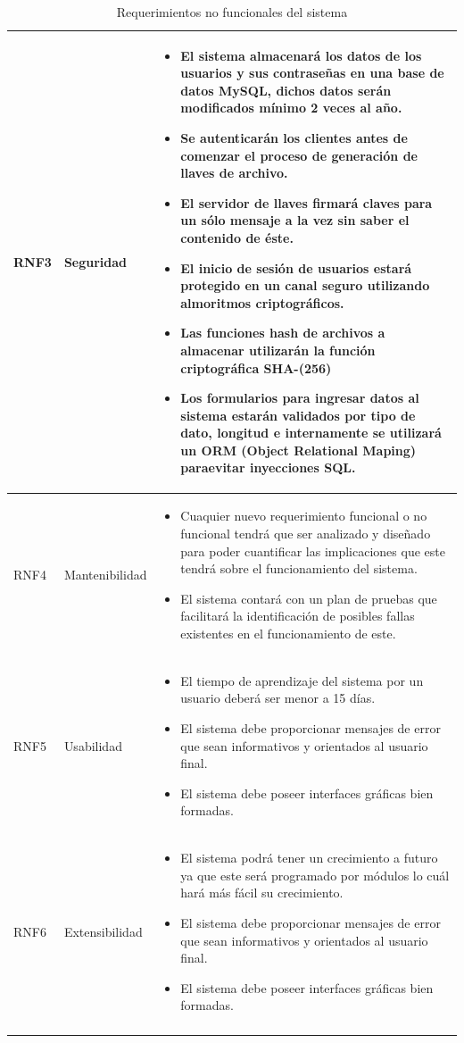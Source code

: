 \begin{longtable}{| p{1.5cm} | p{3cm} | p{11cm} |}
RNF3 & Seguridad & \begin{itemize} 
    \item El sistema almacenará los datos de los usuarios y sus contraseñas en una base de datos MySQL, dichos datos serán modificados mínimo 2  veces al año.  
   \item Se autenticarán los clientes antes de comenzar el proceso de generación de llaves de archivo. 
   \item El servidor de llaves firmará claves para un sólo mensaje a la vez sin saber el contenido de éste. 
   \item El inicio de sesión de usuarios estará protegido en un canal seguro utilizando almoritmos criptográficos. 
   \item Las funciones hash de archivos a almacenar utilizarán la función criptográfica SHA-(256)
   \item Los formularios para ingresar datos al sistema estarán validados por tipo de dato, longitud e internamente se utilizará un ORM (Object Relational Maping) paraevitar inyecciones SQL. 
 \end{itemize}

\\ \hline 
RNF4 & Mantenibilidad & \begin{itemize}
   \item Cuaquier nuevo requerimiento funcional o no funcional tendrá que ser analizado y diseñado para poder cuantificar las implicaciones que este tendrá sobre el funcionamiento del sistema. 
   \item El sistema contará con un plan de pruebas que facilitará la identificación de posibles fallas existentes en el funcionamiento de este. 
 \end{itemize}

\\ \hline
RNF5 & Usabilidad & \begin{itemize}
   \item El tiempo de aprendizaje del sistema por un usuario deberá ser menor a 15 días. 
   \item El sistema debe proporcionar mensajes de error que sean informativos y orientados al usuario final. 
   \item El sistema debe poseer interfaces gráficas bien formadas.
 \end{itemize}

\\ \hline
RNF6 & Extensibilidad & \begin{itemize}
   \item El sistema podrá tener un crecimiento a futuro ya que este será programado por módulos lo cuál hará más fácil su crecimiento.
   \item El sistema debe proporcionar mensajes de error que sean informativos y orientados al usuario final. 
   \item El sistema debe poseer interfaces gráficas bien formadas.
 \end{itemize}
\\ \hline
\caption{Requerimientos no funcionales del sistema}
\label{Requerimientos no funcionales }
\end{longtable}
